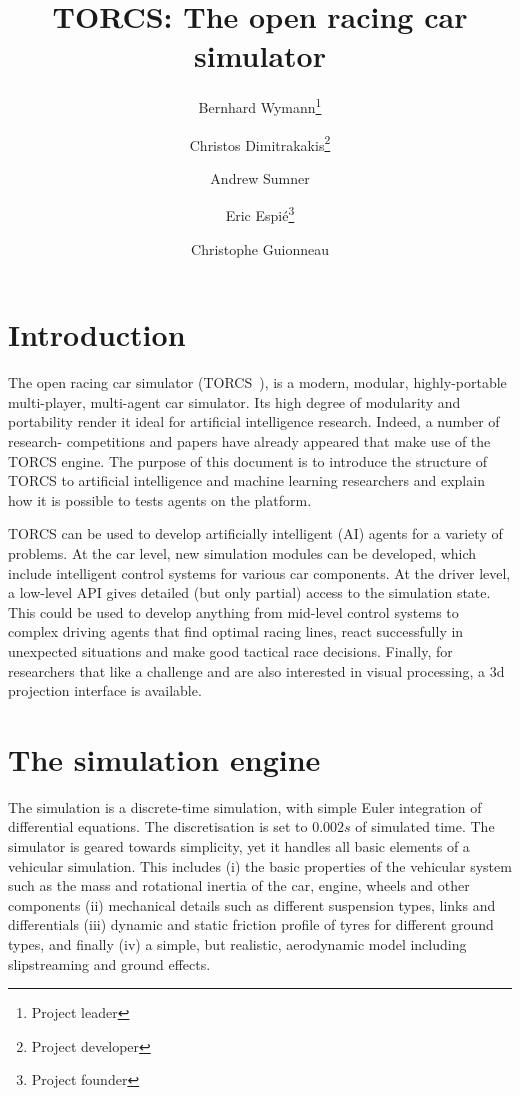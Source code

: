 \documentclass[a4paper]{article}
\title{TORCS: The open racing car simulator}
\author{Bernhard Wymann\footnote{Project leader} \and Christos Dimitrakakis\footnote{Project developer} \and Andrew Sumner\footnotemark[2] \and Eric Espi\'e\footnote{Project founder} \and Christophe Guionneau\footnotemark[3]}
\begin{document}
\maketitle

\section{Introduction}

The open racing car simulator (TORCS~\cite{TORCS}), is a modern, modular, highly-portable multi-player, multi-agent car simulator. Its high degree of modularity and portability render it ideal for artificial intelligence research. Indeed, a number of research- competitions and papers have already appeared that make use of the TORCS engine. The purpose of this document is to introduce the structure of TORCS to artificial intelligence and machine learning researchers and explain how it is possible to tests agents on the platform.

TORCS can be used to develop artificially intelligent (AI) agents for a variety of problems. At the car level, new simulation modules can be developed, which include intelligent control systems for various car components. At the driver level, a low-level API gives detailed (but only partial) access to the simulation state. This could be used to develop anything from mid-level control systems to complex driving agents that find optimal racing lines, react successfully in unexpected situations and make good tactical race decisions. Finally, for researchers that like a challenge and are also interested in visual processing, a 3d projection interface is available.

\section{The simulation engine}

The simulation is a discrete-time simulation, with simple Euler integration of differential equations. The discretisation is set to $0.002s$ of simulated time. The simulator is geared towards simplicity, yet it handles all basic elements of a vehicular simulation.
This includes (i) the basic properties of the vehicular system such as the mass and rotational inertia of the car, engine, wheels and other components  (ii) mechanical details such as different suspension types, links and differentials (iii) dynamic and static friction profile of tyres for different ground types, and finally (iv) a simple, but realistic, aerodynamic model including slipstreaming and ground effects.
\end{document}
